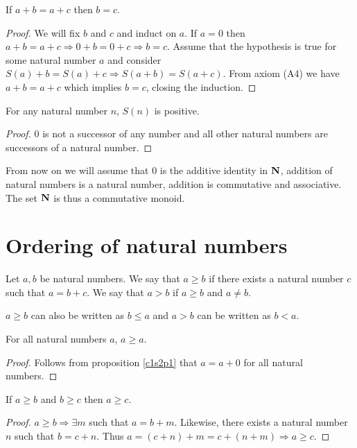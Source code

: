 \begin{prop}\label{c1s2p7}
If $a + b = a + c$ then $b = c$.
\end{prop}
\begin{proof}
We will fix $b$ and $c$ and induct on $a$. If $a = 0$ then $a + b = a + c
\Rightarrow 0 + b = 0 + c \Rightarrow b = c$. Assume that the hypothesis is
true for some natural number $a$ and consider $S(a) + b = S(a) + c 
\Rightarrow S(a + b) = S(a + c)$. From axiom (A4) we have $a + b = a + c$
which implies $b = c$, closing the induction.
\end{proof}

\begin{prop}\label{c1s2p8}
For any natural number $n$, $S(n)$ is positive.
\end{prop}
\begin{proof}
$0$ is not a successor of any number and all other natural numbers are
successors of a natural number.
\end{proof}

From now on we will assume that $0$ is the additive identity in $\mathbf{N}$, 
addition of natural numbers is a natural number, addition is commutative 
and associative. The set $\mathbf{N}$ is thus a commutative monoid.

\section{Ordering of natural numbers}\label{c1s3}
\begin{defn}\label{c1s3d1}
Let $a, b$ be natural numbers. We say that $a \ge b$ if there exists a 
natural number $c$ such that $a = b + c$. We say that $a > b$ if $a \ge b$
and $a \ne b$.
\end{defn}

\begin{rem}
$a \ge b$ can also be written as $b \le a$ and $a > b$ can be written as 
$b < a$.
\end{rem}

\begin{lem}\label{c1s3l1}
For all natural numbers $a$, $a \ge a$.
\end{lem}
\begin{proof}
Follows from proposition \ref{c1s2p1} that $a = a + 0$ for all natural
numbers.
\end{proof}

\begin{lem}\label{c1s3l2}
If $a \ge b$ and $b \ge c$ then $a \ge c$.
\end{lem}
\begin{proof}
$a \ge b \Rightarrow \exists m$ such that $a = b + m$. Likewise, there 
exists a natural number $n$ such that $b = c + n$. Thus $a = (c + n) + m
= c + (n + m) \Rightarrow a \ge c$.
\end{proof}

